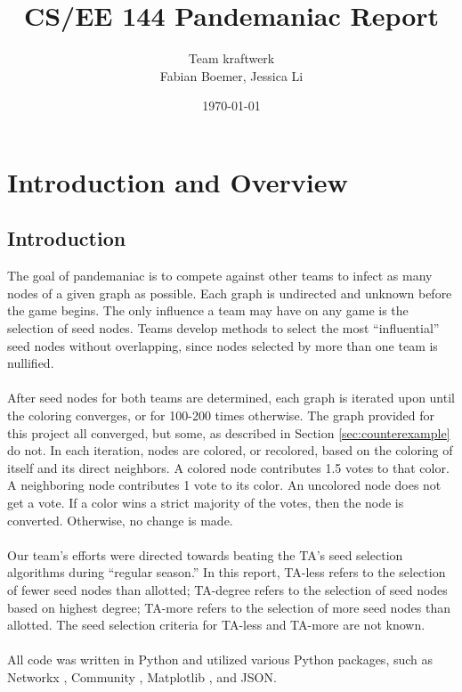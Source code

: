 \documentclass[letterpaper, 11pt]{article}
\begin{document}
\title{CS/EE 144 Pandemaniac Report}
\author{Team kraftwerk \\Fabian Boemer, Jessica Li}
\date{\today}
\maketitle


\section{Introduction and Overview}
\subsection{Introduction}
The goal of pandemaniac is to compete against other teams to infect as many nodes of a given graph as possible. Each graph is undirected and unknown before the game begins. The only influence a team may have on any game is the selection of seed nodes. Teams develop methods to select the most ``influential'' seed nodes without overlapping, since nodes selected by more than one team is nullified.
\\\\
After seed nodes for both teams are determined, each graph is iterated upon until the coloring converges, or for 100-200 times otherwise. The graph provided for this project all converged, but some, as described in Section \ref{sec:counterexample} do not. In each iteration, nodes are colored, or recolored, based on the coloring of itself and its direct neighbors. A colored node contributes 1.5 votes to that color. A neighboring node contributes 1 vote to its color. An uncolored node does not get a vote. If a color wins a strict majority of the votes, then the node is converted. Otherwise, no change is made.
\\\\
Our team's efforts were directed towards beating the TA's seed selection algorithms during ``regular season.'' In this report, TA-less refers to the selection of fewer seed nodes than allotted; TA-degree refers to the selection of seed nodes based on highest degree; TA-more refers to the selection of more seed nodes than allotted. The seed selection criteria for TA-less and TA-more are not known. 
\\\\
All code was written in Python and utilized various Python packages, such as Networkx \cite{networkx} , Community \cite{community}, Matplotlib \cite{matplotlib}, and JSON. 
\end{document}
